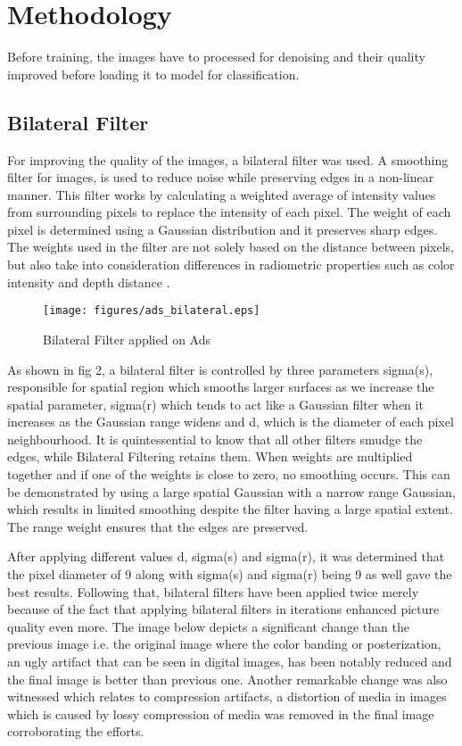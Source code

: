 \documentclass[conference]{IEEEtran}
\begin{document}
\section{Methodology}

Before training, the images have to processed for denoising and their quality improved before loading it to model for classification. 

\subsection{Bilateral Filter}
For improving the quality of the images, a bilateral filter was used. A smoothing filter for images, is used to reduce noise while preserving edges in a non-linear manner. This filter works by calculating a weighted average of intensity values from surrounding pixels to replace the intensity of each pixel. The weight of each pixel is determined using a Gaussian distribution and it preserves sharp edges. The weights used in the filter are not solely based on the distance between pixels, but also take into consideration differences in radiometric properties such as color intensity and depth distance \cite{b15}.

\begin{figure}[htp]
\texttt{[image: figures/ads\_bilateral.eps]}
\caption{Bilateral Filter applied on Ads }
\label{fig}
\end{figure}

As shown in fig 2, a bilateral filter is controlled by three parameters sigma(s), responsible for spatial region which smooths larger surfaces as we increase the spatial parameter, sigma(r) which tends to act like a Gaussian filter when it increases as the Gaussian range widens and d, which is the diameter of each pixel neighbourhood. It is quintessential to know that all other filters smudge the edges, while Bilateral Filtering retains them. When weights are multiplied together and if one of the weights is close to zero, no smoothing occurs. This can be demonstrated by using a large spatial Gaussian with a narrow range Gaussian, which results in limited smoothing despite the filter having a large spatial extent. The range weight ensures that the edges are preserved.

After applying different values d, sigma(s) and sigma(r), it was determined that the pixel diameter of 9 along with sigma(s) and sigma(r) being 9 as well gave the best results. Following that, bilateral filters have been applied twice merely because of the fact that applying bilateral filters in iterations enhanced picture quality even more. The image below depicts a significant change than the previous image i.e. the original image where the color banding or posterization, an ugly artifact that can be seen in digital images, has been notably reduced \cite{b16} and the final image is better than previous one. Another remarkable change was also witnessed which relates to compression artifacts, a distortion of media in images which is caused by lossy compression of media was removed  in the final image corroborating the efforts. 
\end{document}
